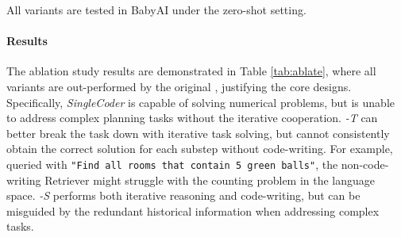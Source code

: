     
All variants are tested in BabyAI under the zero-shot setting. 

\paragraph{Results} The ablation study results are demonstrated in Table \ref{tab:ablate}, where all variants are out-performed by the original \RwR, justifying the core designs. Specifically, 
{\em SingleCoder} is capable of solving numerical problems, but is unable to address complex planning tasks without the iterative cooperation.
{\em \RwR-T} can better break the task down with iterative task solving, but cannot consistently obtain the correct solution for each substep without code-writing. For example, queried with \texttt{\small "Find all rooms that contain 5 green balls"}, the non-code-writing Retriever might struggle with the counting problem in the language space.
{\em \RwR-S} performs both iterative reasoning and code-writing, but can be misguided by the redundant historical information when addressing complex tasks.

